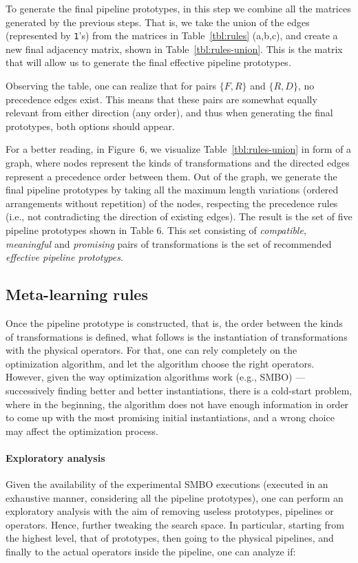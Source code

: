\begin{example}
To generate the final pipeline prototypes, in this step we combine all the matrices generated by the previous steps. That is, we take the union of the edges (represented by \texttt{1}'s) from the matrices in Table~\ref{tbl:rules} (a,b,c), and create a new final adjacency matrix, shown in Table~\ref{tbl:rules-union}. This is the matrix that will allow us to generate the final effective pipeline prototypes. 

Observing the table, one can realize that for pairs $\{F,R\}$ and $\{R,D\}$, no precedence edges exist. This means that these pairs are somewhat equally relevant from either direction (any order), and thus when generating the final prototypes, both options should appear.

For a better reading, in Figure~6, we visualize Table~\ref{tbl:rules-union} in form of a graph, where nodes represent the kinds of transformations and the directed edges represent a precedence order between them.
Out of the graph, we generate the final pipeline prototypes by taking all the maximum length variations (ordered arrangements without repetition) of the nodes, respecting the precedence rules (i.e., not contradicting the direction of existing edges). The result is the set of five pipeline prototypes shown in Table 6. This set consisting of \textit{compatible}, \textit{meaningful} and \textit{promising} pairs of transformations is the set of recommended \textit{effective pipeline prototypes}.
\end{example}

\color{black}
\subsection{Meta-learning rules}
\label{sec:meta-learning}
Once the pipeline prototype is constructed, that is, the order between the kinds of transformations is defined, what follows is the instantiation of transformations with the physical operators. For that, one can rely completely on the optimization algorithm, and let the algorithm choose the right operators. However, given the way optimization algorithms work (e.g., SMBO) --- successively finding better and better instantiations, there is a cold-start problem, where in the beginning, the algorithm does not have enough information in order to come up with the most promising initial instantiations, and a wrong choice may affect the optimization process. 
\paragraph{Exploratory analysis}
Given the availability of the experimental SMBO executions (executed in an exhaustive manner, considering all the pipeline prototypes), one can perform an exploratory analysis with the aim of removing useless prototypes, pipelines or operators. Hence, further tweaking the search space. In particular, starting from the highest level, that of prototypes, then going to the physical pipelines, and finally to the actual operators inside the pipeline, one can analyze if:

